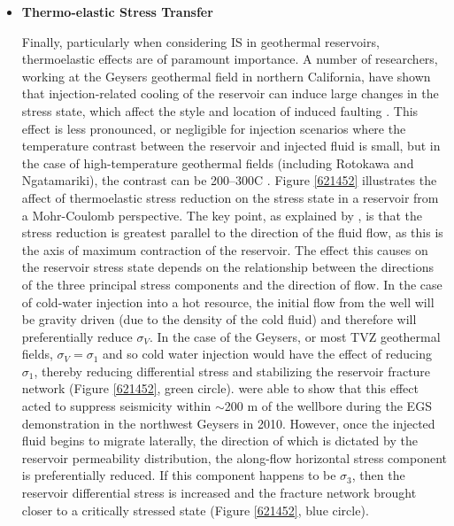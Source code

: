 \begin{itemize}
  \item{\textbf{Thermo-elastic Stress Transfer}}
  
  Finally, particularly when considering IS in geothermal reservoirs, thermoelastic effects are of paramount importance. A number of researchers, working at the Geysers geothermal field in northern California, have shown that injection-related cooling of the reservoir can induce large changes in the stress state, which affect the style and location of induced faulting \citep{Mart_nez_Garz_n_2014,Mart_nez_Garz_n_2013,Mart_nez_Garz_n_2017,Jeanne_2014,Jeanne_2015tensor}. This effect is less pronounced, or negligible for injection scenarios where the temperature contrast between the reservoir and injected fluid is small, but in the case of high-temperature geothermal fields (including Rotokawa and Ngatamariki), the contrast can be 200--300\textdegree C \citep[e.g.][]{Mart_nez_Garz_n_2014,Jeanne_2015tensor}. Figure \ref{621452} illustrates the affect of thermoelastic stress reduction on the stress state in a reservoir from a Mohr-Coulomb perspective. The key point, as explained by \citet{Jeanne_2014,Jeanne_2015tensor}, is that the stress reduction is greatest parallel to the direction of the fluid flow, as this is the axis of maximum contraction of the reservoir. The effect this causes on the reservoir stress state depends on the relationship between the directions of the three principal stress components and the direction of flow. In the case of cold-water injection into a hot resource, the initial flow from the well will be gravity driven (due to the density of the cold fluid) and therefore will preferentially reduce $\sigma_{V}$. In the case of the Geysers, or most TVZ geothermal fields, $\sigma_{V} = \sigma_{1}$ and so cold water injection would have the effect of reducing $\sigma_{1}$, thereby reducing differential stress and stabilizing the reservoir fracture network (Figure \ref{621452}, green circle). \citet{Jeanne_2014} were able to show that this effect acted to suppress seismicity within $\sim$200 m of the wellbore during the EGS demonstration in the northwest Geysers in 2010. However, once the injected fluid begins to migrate laterally, the direction of which is dictated by the reservoir permeability distribution, the along-flow horizontal stress component is preferentially reduced. If this component happens to be $\sigma_{3}$, then the reservoir differential stress is increased and the fracture network brought closer to a critically stressed state (Figure \ref{621452}, blue circle).
\end{itemize}

